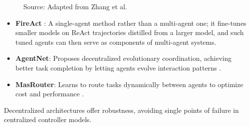 \documentclass[12pt,a4paper]{report}
\theoremstyle{definition}
\newcommand{\source}[1]{\vspace{-0.5\baselineskip}\caption*{\small Source: #1}}
\begin{document}
\begin{figure}[htbp]
\centering
{}
\caption{Decentralized multi-agent architecture showing independent agents (1-4) coordinating through message passing (dashed lines) while interacting with a shared environment. Each agent operates independently while coordinating through messages. All agents interact with a shared environment, so multiple workers can run side-by-side and specialize (e.g., Agent 1: planning, Agent 2: coding, Agent 3: testing). Spreading out the control logic avoids bottlenecks and lets coordination patterns emerge organically.}
\label{fig:multi_agent}
\source{Adapted from Zhang et al.~\cite{zhang2024agentnet}}
\end{figure}

\begin{itemize}
    \item \textbf{FireAct} \cite{chen2023fireact}: A single-agent method rather than a multi-agent one; it fine-tunes smaller models on ReAct trajectories distilled from a larger model, and such tuned agents can then serve as components of multi-agent systems.
    \item \textbf{AgentNet}: Proposes decentralized evolutionary coordination, achieving better task completion by letting agents evolve interaction patterns \cite{zhang2024agentnet}.
    \item \textbf{MasRouter}: Learns to route tasks dynamically between agents to optimize cost and performance \cite{chen2024masrouter}.
\end{itemize}
Decentralized architectures offer robustness, avoiding single points of failure in centralized controller models.
\end{document}
